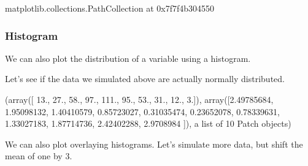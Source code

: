 \documentclass[letterpaper,10pt,english]{sphinxmanual}
\begin{document}
\begin{sphinxVerbatim}[commandchars=\\\{\}]
\PYGZlt{}matplotlib.collections.PathCollection at 0x7f7f4b304550\PYGZgt{}
\end{sphinxVerbatim}

\noindent{}


\subsubsection{Histogram}
\label{\detokenize{content/Introduction_to_Plotting:histogram}}
We can also plot the distribution of a variable using a histogram.

Let’s see if the data we simulated above are actually normally distributed.

\begin{sphinxVerbatim}[commandchars=\\\{\}]
\PYG{p}{[}\PYG{p}{]}
\end{sphinxVerbatim}

\begin{sphinxVerbatim}[commandchars=\\\{\}]
(array([ 13.,  27.,  58.,  97., 111.,  95.,  53.,  31.,  12.,   3.]),
 array([\PYGZhy{}2.49785684, \PYGZhy{}1.95098132, \PYGZhy{}1.40410579, \PYGZhy{}0.85723027, \PYGZhy{}0.31035474,
         0.23652078,  0.78339631,  1.33027183,  1.87714736,  2.42402288,
         2.9708984 ]),
 \PYGZlt{}a list of 10 Patch objects\PYGZgt{})
\end{sphinxVerbatim}

\noindent{}

We can also plot overlaying histograms. Let’s simulate more data, but shift the mean of one by 3.

\begin{sphinxVerbatim}[commandchars=\\\{\}]
  
  \PYG{p}{[} \PYG{p}{]}
  \PYG{p}{[}
    \PYG{p}{[} \PYG{p}{]}
    \PYG{p}{[} \PYG{p}{]}\PYG{p}{]}
    

 
\end{sphinxVerbatim}
\end{document}
